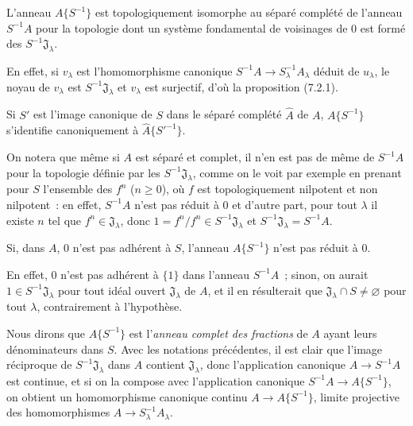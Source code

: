 \begin{proposition}[7.6.2]
\label{0.7.6.2-fr}
L'anneau $A\{S^{-1}\}$ est topologiquement isomorphe au séparé complété de
l'anneau $S^{-1}A$ pour la topologie dont un système fondamental de voisinages
de 0 est formé des $S^{-1}\mathfrak J_\lambda$.
\end{proposition}

En effet, si $v_\lambda$ est l'homomorphisme canonique
$S^{-1}A\to S_\lambda^{-1}A_\lambda$ déduit de $u_\lambda$, le noyau de
$v_\lambda$ est $S^{-1}\mathfrak J_\lambda$ et $v_\lambda$ est surjectif,
d'où la proposition (7.2.1).

\begin{corollary}[7.6.3]
\label{0.7.6.3-fr}
Si $S'$ est l'image canonique de $S$ dans le séparé complété $\widehat A$ de
$A$, $A\{S^{-1}\}$ s'identifie canoniquement à
$\widehat A\{{S'}^{-1}\}$.
\end{corollary}

On notera que même si $A$ est séparé et complet, il n'en est pas de même de
$S^{-1}A$ pour la topologie définie par les
$S^{-1}\mathfrak J_\lambda$, comme on le voit par exemple en prenant pour $S$
l'ensemble des $f^n$ ($n\geq0$), où $f$ est topologiquement nilpotent et non
nilpotent~: en effet, $S^{-1}A$ n'est pas réduit à 0 et d'autre part, pour tout
$\lambda$ il existe $n$ tel que $f^n\in\mathfrak J_\lambda$, donc
$1=f^n/f^n\in S^{-1}\mathfrak J_\lambda$ et
$S^{-1}\mathfrak J_\lambda=S^{-1}A$.


\begin{corollary}[7.6.4]
\label{0.7.6.4-fr}
Si, dans $A$, $0$ n'est pas adhérent à $S$, l'anneau $A\{S^{-1}\}$ n'est pas
réduit à $0$.
\end{corollary}

En effet, $0$ n'est pas adhérent à $\{1\}$ dans l'anneau $S^{-1}A$~; sinon,
on aurait $1\in S^{-1}\mathfrak J_\lambda$ pour tout idéal ouvert
$\mathfrak J_\lambda$ de $A$, et il en résulterait que
$\mathfrak J_\lambda\cap S\neq\varnothing$ pour tout $\lambda$, contrairement
à l'hypothèse.

\begin{env}[7.6.5]
\label{0.7.6.5-fr}
Nous dirons que $A\{S^{-1}\}$ est l'\emph{anneau complet des fractions} de $A$
ayant leurs dénominateurs dans $S$. Avec les notations précédentes, il est clair
que l'image réciproque de $S^{-1}\mathfrak J_\lambda$ dans $A$ contient
$\mathfrak J_\lambda$, donc l'application canonique $A\to S^{-1}A$ est
continue, et si on la compose avec l'application canonique
$S^{-1}A\to A\{S^{-1}\}$, on obtient un homomorphisme canonique continu
$A\to A\{S^{-1}\}$, limite projective des homomorphismes
$A\to S_\lambda^{-1}A_\lambda$.
\end{env}

